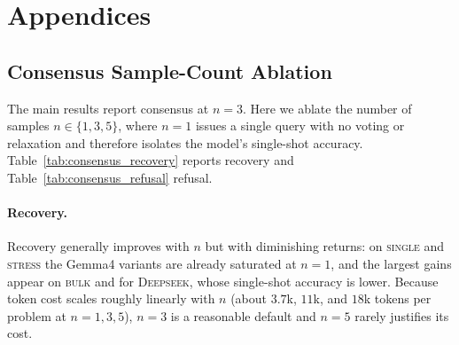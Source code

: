 \clearpage
\onecolumn
\section{Appendices}

\subsection{Consensus Sample-Count Ablation}
\label{app:consensus}

The main results report consensus at $n{=}3$. Here we ablate the number of samples
$n\in\{1,3,5\}$, where $n{=}1$ issues a single query with no voting or relaxation and
therefore isolates the model's single-shot accuracy. Table~\ref{tab:consensus_recovery}
reports recovery and Table~\ref{tab:consensus_refusal} refusal.

\paragraph{Recovery.} Recovery generally improves with $n$ but with diminishing returns:
on \textsc{single} and \textsc{stress} the Gemma4 variants are already saturated at
$n{=}1$, and the largest gains appear on \textsc{bulk} and for \textsc{Deepseek}, whose
single-shot accuracy is lower. Because token cost scales roughly linearly with $n$
(about $3.7$k, $11$k, and $18$k tokens per problem at $n{=}1,3,5$), $n{=}3$ is a
reasonable default and $n{=}5$ rarely justifies its cost.

